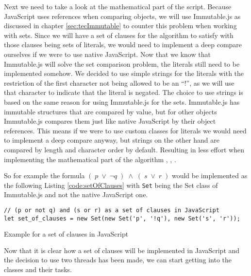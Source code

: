 Next we need to take a look at the mathematical part of the script. Because JavaScript uses references when comparing objects, we will use Immutable.js as discussed in chapter \ref{sec:tecImmutable} to counter this problem when working with sets. Since we will have a set of clauses for the algorithm to satisfy with those clauses being sets of literals, we would need to implement a deep compare ourselves if we were to use native JavaScript. Now that we know that Immutable.js will solve the set comparison problem, the literals still need to be implemented somehow. We decided to use simple strings for the literals with the restriction of the first character not being allowed to be an ``!'', as we will use that character to indicate that the literal is negated. The choice to use strings is based on the same reason for using Immutable.js for the sets. Immutable.js has immutable structures that are compared by value, but for other objects Immutable.js compares them just like native JavaScript by their object references. This means if we were to use custom classes for literals we would need to implement a deep compare anyway, but strings on the other hand are compared by length and character order by default. Resulting in less effort when implementing the mathematical part of the algorithm \cite{MozillaDevelopers2019a}, \cite{MozillaDevelopers2019b}, \cite{ImmutableDevelopers2019}.

So for example the formula $(\; p\; \lor\; \neg q\; )\; \land\; (\; s\; \lor\; r\; )$ would be implemented as the following Listing \ref{code:setOfClauses} with \texttt{Set} being the Set class of Immutable.js and not the native JavaScript one.

\begin{listing}[H]
\begin{verbatim}
// (p or not q) and (s or r) as a set of clauses in JavaScript
let set_of_clauses = new Set(new Set('p', '!q'), new Set('s', 'r'));
\end{verbatim}
    \caption{Example for a set of clauses in JavaScript}
    \label{code:setOfClauses}
\end{listing}

Now that it is clear how a set of clauses will be implemented in JavaScript and the decision to use two threads has been made, we can start getting into the classes and their tasks.


